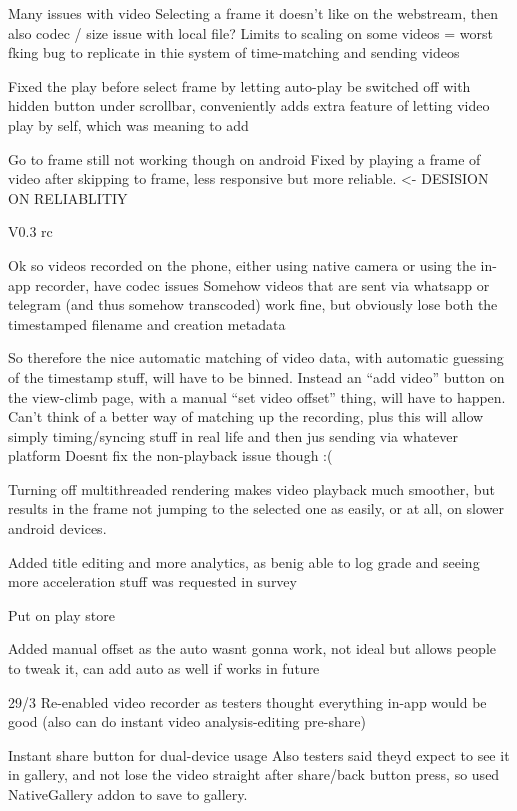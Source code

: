 Many issues with video
Selecting a frame it doesn’t like on the webstream, then also codec / size issue with local file?
Limits to scaling on some videos = worst fking bug to replicate in thie system of time-matching and sending videos

Fixed the play before select frame by letting auto-play be switched off with hidden button under scrollbar, conveniently adds extra feature of letting video play by self, which was meaning to add

Go to frame still not working though on android
Fixed by playing a frame of video after skipping to frame, less responsive but more reliable. <- DESISION ON RELIABLITIY


V0.3 rc





Ok so videos recorded on the phone, either using native camera or using the in-app recorder, have codec issues
Somehow videos that are sent via whatsapp or telegram (and thus somehow transcoded) work fine, but obviously lose both the timestamped filename and creation metadata

So therefore the nice automatic matching of video data, with automatic guessing of the timestamp stuff, will have to be binned.
Instead an “add video” button on the view-climb page, with a manual “set video offset” thing, will have to happen.
Can’t think of a better way of matching up the recording, plus this will allow simply timing/syncing stuff in real life and then jus sending via whatever platform
Doesnt fix the non-playback issue though :(

Turning off multithreaded rendering makes video playback much smoother, but results in the frame not jumping to the selected one as easily, or at all, on slower android devices.


Added title editing and more analytics, as benig able to log grade and seeing more acceleration stuff was requested in survey

Put on play store

Added manual offset as the auto wasnt gonna work, not ideal but allows people to tweak it, can add auto as well if works in future


29/3
Re-enabled video recorder as testers thought everything in-app would be good (also can do instant video analysis-editing pre-share)

Instant share button for dual-device usage
Also testers said theyd expect to see it in gallery, and not lose the video straight after share/back button press, so used NativeGallery addon to save to gallery.

